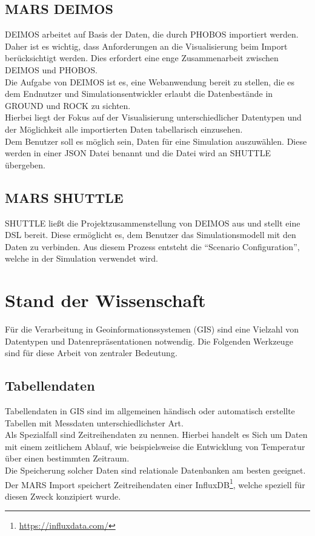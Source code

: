 \documentclass[10pt,conference,compsocconf]{IEEEtran}
\begin{document}
\subsection{MARS DEIMOS}
\label{sub:deimos}
DEIMOS arbeitet auf Basis der Daten, die durch PHOBOS importiert werden. Daher ist es wichtig, dass Anforderungen an die Visualisierung beim Import berücksichtigt werden. Dies erfordert eine enge Zusammenarbeit zwischen DEIMOS und PHOBOS.\\
Die Aufgabe von DEIMOS ist es, eine Webanwendung bereit zu stellen, die es dem Endnutzer und Simulationsentwickler erlaubt die Datenbestände in GROUND und ROCK zu sichten.\\
Hierbei liegt der Fokus auf der Visualisierung unterschiedlicher Datentypen und der Möglichkeit alle importierten Daten tabellarisch einzusehen.\\
Dem Benutzer soll es möglich sein, Daten für eine Simulation auszuwählen. Diese werden in einer JSON Datei benannt und die Datei wird an SHUTTLE übergeben.\\


\subsection{MARS SHUTTLE}
SHUTTLE ließt die Projektzusammenstellung von DEIMOS aus und stellt eine DSL bereit. Diese ermöglicht es, dem Benutzer das Simulationsmodell mit den Daten zu verbinden. Aus diesem Prozess entsteht die \enquote{Scenario Configuration}, welche in der Simulation verwendet wird.\\



\section{Stand der Wissenschaft}
Für die Verarbeitung in Geoinformationssystemen (GIS) sind eine Vielzahl von Datentypen und Datenrepräsentationen notwendig. Die Folgenden Werkzeuge sind für diese Arbeit von zentraler Bedeutung.\\


\subsection{Tabellendaten}
Tabellendaten in GIS sind im allgemeinen händisch oder automatisch erstellte Tabellen mit Messdaten unterschiedlichster Art. \\
Als Spezialfall sind Zeitreihendaten zu nennen. Hierbei handelt es Sich um Daten mit einem zeitlichem Ablauf, wie beispielsweise die Entwicklung von Temperatur über einen bestimmten Zeitraum.\\
Die Speicherung solcher Daten sind relationale Datenbanken am besten geeignet. Der MARS Import speichert Zeitreihendaten einer InfluxDB\footnote{\url{https://influxdata.com/}}, welche speziell für diesen Zweck konzipiert wurde.\\
\end{document}
